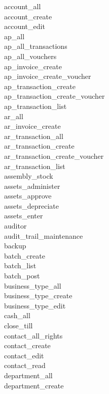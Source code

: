\begin{description}
\item[account\_all]
\item [account\_create]
\item [account\_edit]
\item [ap\_all]
\item [ap\_all\_transactions]
\item [ap\_all\_vouchers]
\item [ap\_invoice\_create]
\item [ap\_invoice\_create\_voucher]
\item [ap\_transaction\_create]
\item [ap\_transaction\_create\_voucher]
\item [ap\_transaction\_list]
\item [ar\_all]
\item [ar\_invoice\_create]
\item [ar\_transaction\_all]
\item [ar\_transaction\_create]
\item [ar\_transaction\_create\_voucher]
\item [ar\_transaction\_list]
\item [assembly\_stock]
\item [assets\_administer]
\item [assets\_approve]
\item [assets\_depreciate]
\item [assets\_enter]
\item [auditor]
\item [audit\_trail\_maintenance]
\item [backup]
\item [batch\_create]
\item [batch\_list]
\item [batch\_post]
\item [business\_type\_all]
\item [business\_type\_create]
\item [business\_type\_edit]
\item [cash\_all]
\item [close\_till]
\item [contact\_all\_rights]
\item [contact\_create]
\item [contact\_edit]
\item [contact\_read]
\item [department\_all]
\item [department\_create]

\end{description}
